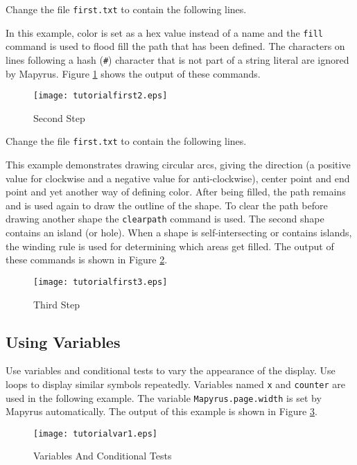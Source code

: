 Change the file \texttt{first.txt} to contain the following lines.



In this example, color is set as a hex value instead of a name and
the \texttt{fill} command is used to
flood fill the path that has been defined.
The characters on lines following a hash (\texttt{\#}) character that
is not part of a string literal are ignored by Mapyrus.
Figure \ref{tutorialfirst2} shows the output of these commands.

\begin{figure}[h]
\texttt{[image: tutorialfirst2.eps]}
\caption{Second Step}
\label{tutorialfirst2}
\end{figure}

Change the file \texttt{first.txt} to contain the following lines.



This example demonstrates drawing circular arcs,
giving the direction (a positive value for clockwise and a negative
value for anti-clockwise), center point and end point and
yet another way of defining color.
After being filled, the path remains and is used again to draw the outline
of the shape.
To clear the path before drawing another shape the
\texttt{clearpath}
command is used.
The second shape contains an island (or hole).  When a shape is
self-intersecting or contains islands, the winding rule is
used for determining which areas get filled.
The output of these commands is shown in Figure \ref{tutorialfirst3}.

\begin{figure}[h]
\texttt{[image: tutorialfirst3.eps]}
\caption{Third Step}
\label{tutorialfirst3}
\end{figure}

\subsection{Using Variables}

Use variables and conditional tests to vary the appearance
of the display.
Use loops to display similar symbols repeatedly.
Variables named \texttt{x} and \texttt{counter} are used in the
following example.  The variable
\texttt{Mapyrus.page.width}
is set by Mapyrus automatically.
The output of this example is shown in Figure \ref{tutorialvar1}.



\begin{figure}[h]
\texttt{[image: tutorialvar1.eps]}
\caption{Variables And Conditional Tests}
\label{tutorialvar1}
\end{figure}

